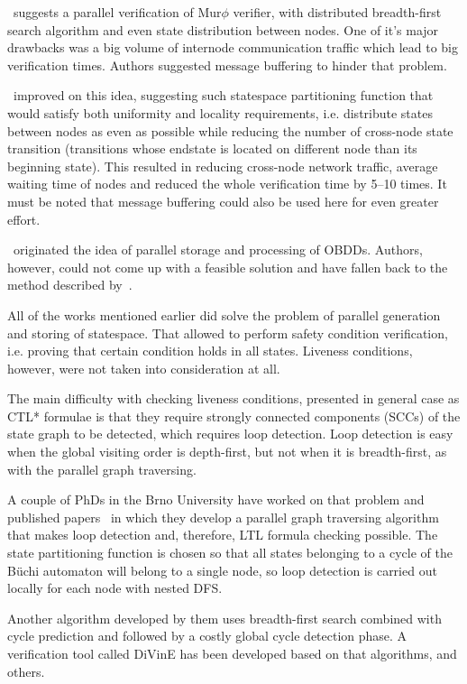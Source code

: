 \documentclass[a4paper,notitlepage,14pt]{article}
\begin{document}
\cite{Stern97parallelizingthe}~suggests a parallel verification of Mur$\phi$ verifier, with distributed
breadth-first search algorithm and even state distribution between nodes. One of it's
major drawbacks was a big volume of internode communication traffic which lead to big
verification times. Authors suggested message buffering to hinder that problem.

\cite{LS99}~improved on this idea, suggesting such statespace partitioning function that would
satisfy both uniformity and locality requirements, i.e. distribute states between nodes as
even as possible while reducing the number of cross-node state transition (transitions
whose endstate is located on different node than its beginning state). This resulted in
reducing cross-node network traffic, average waiting time of nodes and reduced the whole
verification time by 5--10 times. It must be noted that message buffering could also be
used here for even greater effort.

\cite{McMillan92}~originated the idea of parallel storage and processing of OBDDs. Authors, however,
could not come up with a feasible solution and have fallen back to the method described
by~\cite{LS99}.

All of the works mentioned earlier did solve the problem of parallel generation and storing of
statespace. That allowed to perform safety condition verification, i.e. proving that
certain condition holds in all states. Liveness conditions, however, were not taken into
consideration at all.

The main difficulty with checking liveness conditions, presented in general case as CTL*
formulae is that they require strongly connected components (SCCs) of the state graph to
be detected, which requires loop detection. Loop detection is easy when the global
visiting order is depth-first, but not when it is breadth-first, as with the parallel
graph traversing.

A couple of PhDs in the Brno University have worked on that problem and published
papers~\cite{DLTL1,DLTL2} in which they develop a parallel graph traversing algorithm that makes loop
detection and, therefore, LTL formula checking possible. The state partitioning function
is chosen so that all states belonging to a cycle of the B\"{u}chi automaton will belong to a
single node, so loop detection is carried out locally for each node with nested DFS. 

Another algorithm developed by them uses breadth-first search combined with cycle
prediction and followed by a costly global cycle detection phase. A verification tool
called DiVinE has been developed based on that algorithms, and others.
\end{document}
